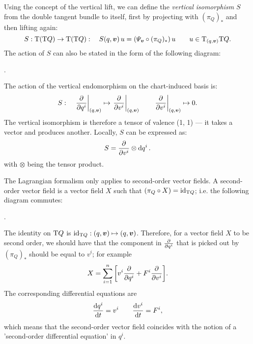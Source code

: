 Using the concept of the vertical lift, we can define the \emph{vertical isomorphism} $S$ from the double tangent bundle to itself, first by projecting with $(\pi_Q)_*$ and then lifting again:
$$ S: \tbundle{\qty(\tbundle{Q})} \to \tbundle{\qty(\tbundle{Q})}: \quad S(q, \vec{v})\,u = \qty(\Psi_{\vec{v}} \circ (\pi_Q)_*)\,u \qquad u \in \tspace{(q, \vec{v})}{\tbundle{Q}}.  $$
The action of $S$ can also be stated in the form of the following diagram:
\begin{center}
   .
\end{center}
The action of the vertical endomorphism on the chart-induced basis is:
$$ S: \quad \left. \pdv{}{q^i}\right|_{(q, \vec{v})} \mapsto \left.\pdv{}{v^i}\right|_{(q, \vec{v})} \qquad  \left. \pdv{}{v^i}\right|_{(q, \vec{v})} \mapsto 0. $$
The vertical isomorphism is therefore a tensor of valence (1, 1) --- it takes a vector and produces another. Locally, $S$ can be expressed as:
$$ S = \pdv{}{v^i}\otimes \dd{q^i}. $$
with $\otimes$ being the tensor product. \cite{Carinena1990}

The Lagrangian formalism only applies to second-order vector fields. A second-order vector field is a vector field $X$ such that $(\pi_Q \circ X) = \mathrm{id}_{\mathrm{T}Q}$; i.e. the following diagram commutes: \cite{Abraham1978}
\begin{center}
   .
\end{center}
The identity on $\mathrm{T}Q$ is $\mathrm{id}_{\tbundle{Q}}: (q, \vec{v}) \mapsto (q, \vec{v})$. Therefore, for a vector field $X$ to be second order, we should have that the component in $\pdv{}{q^i}$ that is picked out by $(\pi_Q)_*$ should be equal to $v^i$; for example
$$ X = \sum_{i=1}^n \qty[v^i \pdv{q^i} + F^i\pdv{v^i}]. $$
The corresponding differential equations are
$$ \dv{q^i}{t} = v^i \qquad \dv{v^i}{t} = F^i, $$
which means that the second-order vector field coincides with the notion of a 'second-order differential equation' in $q^i$.

